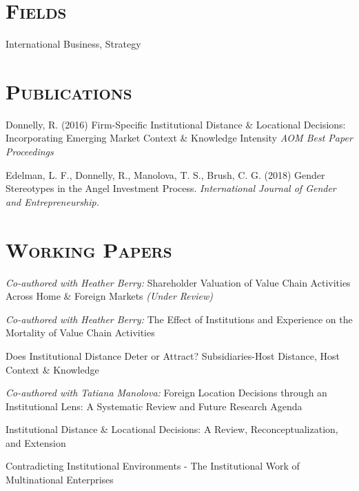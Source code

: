 \documentclass[margin, 12pt]{res}
\begin{document}
\begin{resume}
\section{\normalfont\textsc{Fields}}
International Business, Strategy

\section{\normalfont\textsc{Publications}}
Donnelly, R. (2016) Firm-Specific Institutional Distance \& Locational Decisions: Incorporating Emerging Market Context \& Knowledge Intensity  \textit{AOM  Best Paper Proceedings}

Edelman, L. F., Donnelly, R., Manolova, T. S., Brush, C. G. (2018) Gender Stereotypes in the Angel Investment Process. \textit{International Journal of Gender and Entrepreneurship.} 



\section{\normalfont\textsc{Working Papers}}


\textit{Co-authored with Heather Berry:} Shareholder Valuation of Value Chain Activities Across Home \& Foreign Markets \textit{(Under Review)}

\textit{Co-authored with Heather Berry:}  The Effect of Institutions and Experience on the Mortality of Value Chain Activities


Does Institutional Distance Deter or Attract? Subsidiaries-Host Distance, Host Context \& Knowledge	


\textit{Co-authored with Tatiana Manolova:} Foreign Location Decisions through an Institutional Lens: A Systematic Review and Future Research Agenda  


Institutional Distance \& Locational Decisions: A Review, Reconceptualization, and Extension 

Contradicting Institutional Environments - The Institutional Work of Multinational Enterprises 

\bigskip
\bigskip


\end{resume}
\end{document}
